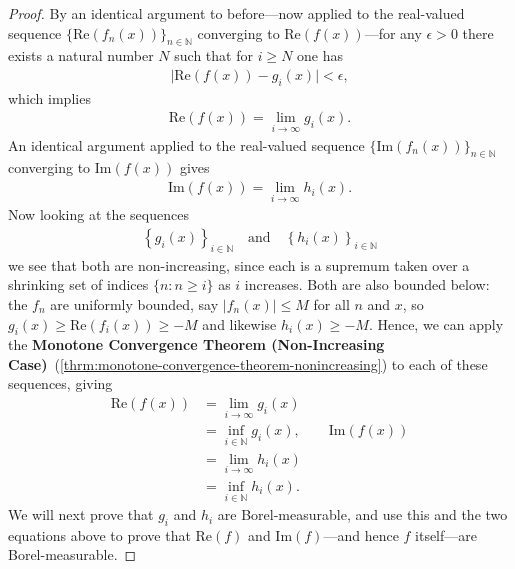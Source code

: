 \begin{proof}
By an identical argument to before---now applied to the real-valued sequence $\{ \text{Re}(f_n(x)) \}_{n \in \mathbb{N}}$ converging to $\text{Re}(f(x))$---for any $\epsilon > 0$ there exists a natural number $N$ such that for $i \ge N$ one has
\begin{align}
    \lvert \text{Re}(f(x)) - g_i(x) \rvert < \epsilon,
\end{align}
which implies
\begin{align}
    \text{Re}(f(x)) = \lim\limits_{i \rightarrow \infty} g_i(x).
\end{align}
An identical argument applied to the real-valued sequence $\{ \text{Im}(f_n(x)) \}_{n \in \mathbb{N}}$ converging to $\text{Im}(f(x))$ gives
\begin{align}
    \text{Im}(f(x)) = \lim\limits_{i \rightarrow \infty} h_i(x).
\end{align}
Now looking at the sequences
\begin{align}
    \left\{  g_i(x) \right\}_{i \in \mathbb{N}} \quad \text{and} \quad \left\{  h_i(x) \right\}_{i \in \mathbb{N}}
\end{align}
we see that both are non-increasing, since each is a supremum taken over a shrinking set of indices $\{ n : n \ge i \}$ as $i$ increases. Both are also bounded below: the $f_n$ are uniformly bounded, say $\lvert f_n(x) \rvert \le M$ for all $n$ and $x$, so $g_i(x) \ge \text{Re}(f_i(x)) \ge -M$ and likewise $h_i(x) \ge -M$. Hence, we can apply the \textbf{Monotone Convergence Theorem (Non-Increasing Case)}~(\ref{thrm:monotone-convergence-theorem-nonincreasing}) to each of these sequences, giving
\begin{align}
    \text{Re}(f(x)) &= \lim\limits_{i \rightarrow \infty} g_i(x) \\
                &= \inf_{i \in \mathbb{N}} g_i(x), \qquad \text{Im}(f(x)) \\
                &= \lim\limits_{i \rightarrow \infty} h_i(x) \\
                &= \inf_{i \in \mathbb{N}} h_i(x).
\end{align}
We will next prove that $g_i$ and $h_i$ are Borel-measurable, and use this and the two equations above to prove that $\text{Re}(f)$ and $\text{Im}(f)$---and hence $f$ itself---are Borel-measurable.


\end{proof}
